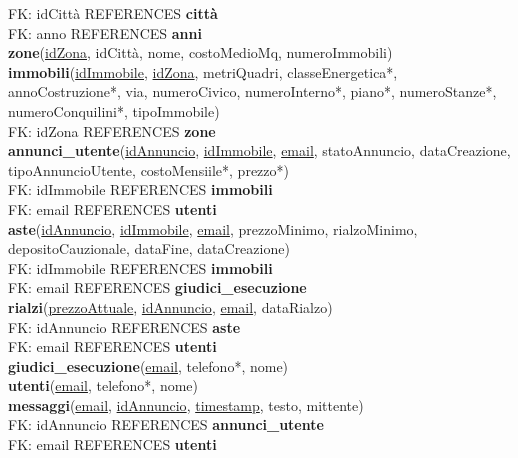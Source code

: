 \documentclass[a4paper,12pt]{report}
\begin{document}
            \null\quad\quad FK: idCittà REFERENCES \textbf{città} \\
            \null\quad\quad FK: anno REFERENCES \textbf{anni} \\
        \textbf{zone}(\underline{idZona}, idCittà, nome, costoMedioMq, numeroImmobili) \\
        \textbf{immobili}(\underline{idImmobile}, \underline{idZona}, metriQuadri, classeEnergetica*, annoCostruzione*, via, numeroCivico, numeroInterno*, piano*, numeroStanze*, numeroConquilini*, tipoImmobile) \\
            \null\quad\quad FK: idZona REFERENCES \textbf{zone} \\
        \textbf{annunci\_utente}(\underline{idAnnuncio}, \underline{idImmobile}, \underline{email}, statoAnnuncio, dataCreazione, tipoAnnuncioUtente, costoMensiile*, prezzo*) \\
            \null\quad\quad FK: idImmobile REFERENCES \textbf{immobili} \\
            \null\quad\quad FK: email REFERENCES \textbf{utenti} \\
        \textbf{aste}(\underline{idAnnuncio}, \underline{idImmobile}, \underline{email}, prezzoMinimo, rialzoMinimo, depositoCauzionale, dataFine, dataCreazione) \\
            \null\quad\quad FK: idImmobile REFERENCES \textbf{immobili} \\
            \null\quad\quad FK: email REFERENCES \textbf{giudici\_esecuzione} \\
        \textbf{rialzi}(\underline{prezzoAttuale}, \underline{idAnnuncio}, \underline{email}, dataRialzo) \\
            \null\quad\quad FK: idAnnuncio REFERENCES \textbf{aste} \\
            \null\quad\quad FK: email REFERENCES \textbf{utenti} \\
        \textbf{giudici\_esecuzione}(\underline{email}, telefono*, nome) \\
        \textbf{utenti}(\underline{email}, telefono*, nome) \\
        \textbf{messaggi}(\underline{email}, \underline{idAnnuncio}, \underline{timestamp}, testo, mittente) \\
            \null\quad\quad FK: idAnnuncio REFERENCES \textbf{annunci\_utente} \\
            \null\quad\quad FK: email REFERENCES \textbf{utenti} \\
        	
\end{document}
